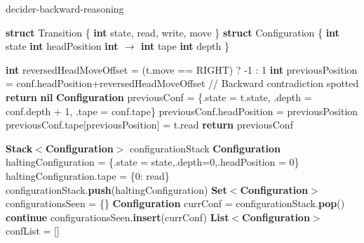 \begin{algorithm}
  \caption{{\sc decider-backward-reasoning}}\label{alg:backward-reasoning}

  \begin{algorithmic}[1]
    \State \textbf{struct} Transition \{
      \State \tabi\textbf{int} state, read, write, move
      \State \}
          \State \textbf{struct} Configuration \{
          \State \tabi\textbf{int} state
          \State \tabi\textbf{int} headPosition
          \State \tabi\textbf{int $\boldsymbol{\to}$ int} tape
          \State \tabi\textbf{int} depth
          \State \}
         
          \State
          
          \State \textbf{int} reversedHeadMoveOffset = (t.move == RIGHT) ? -1 : 1
          \State \textbf{int} previousPosition = conf.headPosition+reversedHeadMoveOffset
          \State // Backward contradiction spotted
          \State \textbf{return} \textbf{nil}
          \EndIf
          \State \textbf{Configuration} previousConf = \{.state = t.state, .depth = conf.depth + 1, .tape = conf.tape\}
          \State previousConf.headPosition = previousPosition
          \State previousConf.tape[previousPosition] = t.read
          \State \textbf{return} previousConf
          \EndProcedure
          \State
          
          \State \textbf{Stack$\boldsymbol{<}$Configuration$\boldsymbol{>}$} configurationStack
          \State \textbf{Configuration} haltingConfiguration = \{.state = state,.depth=0,.headPosition = 0\}
          \State haltingConfiguration.tape = \{0: read\}
          \State configurationStack.\textbf{push}(haltingConfiguration)
          \EndFor
          \State \textbf{Set$\boldsymbol{<}$Configuration$\boldsymbol{>}$} configurationsSeen = \{\}
          \State \textbf{Configuration} currConf = configurationStack.\textbf{pop}()
           \textbf{continue} \EndIf
          \State configurationsSeen.\textbf{insert}(currConf)
          \State \textbf{List$\boldsymbol{<}$Configuration$\boldsymbol{>}$} confList = []
          

\end{algorithmic}
\end{algorithm}
